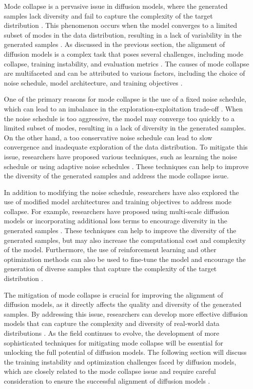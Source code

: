 \documentclass[11pt,a4paper]{article}
\begin{document}
Mode collapse is a pervasive issue in diffusion models, where the generated samples lack diversity and fail to capture the complexity of the target distribution \cite{doi:10.1109/tpami.2023.3261988}. This phenomenon occurs when the model converges to a limited subset of modes in the data distribution, resulting in a lack of variability in the generated samples \cite{doi:10.1145/3626235}. As discussed in the previous section, the alignment of diffusion models is a complex task that poses several challenges, including mode collapse, training instability, and evaluation metrics \cite{arxiv:2408.10207}. The causes of mode collapse are multifaceted and can be attributed to various factors, including the choice of noise schedule, model architecture, and training objectives \cite{arxiv:2102.09672}.

One of the primary reasons for mode collapse is the use of a fixed noise schedule, which can lead to an imbalance in the exploration-exploitation trade-off \cite{arxiv:2106.00132}. When the noise schedule is too aggressive, the model may converge too quickly to a limited subset of modes, resulting in a lack of diversity in the generated samples. On the other hand, a too conservative noise schedule can lead to slow convergence and inadequate exploration of the data distribution. To mitigate this issue, researchers have proposed various techniques, such as learning the noise schedule \cite{arxiv:2202.09778} or using adaptive noise schedules \cite{arxiv:2206.05564}. These techniques can help to improve the diversity of the generated samples and address the mode collapse issue.

In addition to modifying the noise schedule, researchers have also explored the use of modified model architectures and training objectives to address mode collapse. For example, researchers have proposed using multi-scale diffusion models \cite{arxiv:2303.07576} or incorporating additional loss terms to encourage diversity in the generated samples \cite{arxiv:2310.02279}. These techniques can help to improve the diversity of the generated samples, but may also increase the computational cost and complexity of the model. Furthermore, the use of reinforcement learning and other optimization methods can also be used to fine-tune the model and encourage the generation of diverse samples that capture the complexity of the target distribution \cite{arxiv:2305.13301}.

The mitigation of mode collapse is crucial for improving the alignment of diffusion models, as it directly affects the quality and diversity of the generated samples. By addressing this issue, researchers can develop more effective diffusion models that can capture the complexity and diversity of real-world data distributions \cite{arxiv:2502.06805}. As the field continues to evolve, the development of more sophisticated techniques for mitigating mode collapse will be essential for unlocking the full potential of diffusion models. The following section will discuss the training instability and optimization challenges faced by diffusion models, which are closely related to the mode collapse issue and require careful consideration to ensure the successful alignment of diffusion models \cite{doi:10.1145/3626235}.
\end{document}
